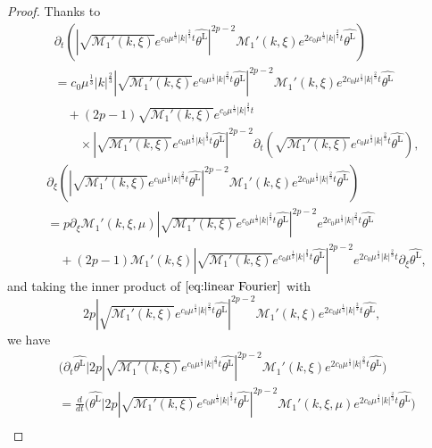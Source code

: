 \documentclass[reqno, 12pt]{amsart} %
\theoremstyle{plain} %
\theoremstyle{definition}
\theoremstyle{remark}
\numberwithin{equation}{section} %
\newcommand{\lt}{\left}
\newcommand{\rt}{\right}
\newcommand{\pt}{\partial_t}
\begin{document}
\begin{proof}
		Thanks to 
		\begin{align*}
			&\pt\lt( | \sqrt{\mathcal{M}_1'(k, \xi)} e^{c_0 \mu^\frac13 |k|^\frac23 t} \widehat{\theta^{\mathrm{L}} }|^{2p-2} \mathcal{M}_1'(k, \xi) e^{2c_0 \mu^\frac13 |k|^\frac23 t} \widehat{\theta^{\mathrm{L}} } \rt) \\
			&=c_0\mu^\frac13 |k|^\frac23 | \sqrt{\mathcal{M}_1'(k, \xi)} e^{c_0 \mu^\frac13 |k|^\frac23 t} \widehat{\theta^{\mathrm{L}} }|^{2p-2}  \mathcal{M}_1'(k, \xi) e^{2c_0 \mu^\frac13 |k|^\frac23 t} \widehat{\theta^{\mathrm{L}} }\\
			& \quad + (2p-1) \sqrt{\mathcal{M}_1'(k, \xi)} e^{c_0 \mu^\frac13 |k|^\frac23 t} \\
			&\qquad \times | \sqrt{\mathcal{M}_1'(k, \xi)} e^{c_0 \mu^\frac13 |k|^\frac23 t} \widehat{\theta^{\mathrm{L}} }|^{2p-2} \pt( \sqrt{\mathcal{M}_1'(k, \xi)} e^{c_0 \mu^\frac13 |k|^\frac23 t} \widehat{\theta^{\mathrm{L}} }),
		\end{align*}
		\begin{align*}
			&\partial_\xi \lt( | \sqrt{\mathcal{M}_1'(k, \xi)} e^{c_0 \mu^\frac13 |k|^\frac23 t} \widehat{\theta^{\mathrm{L}} }|^{2p-2} \mathcal{M}_1'(k, \xi) e^{2c_0 \mu^\frac13 |k|^\frac23 t} \widehat{\theta^{\mathrm{L}} } \rt) \\
			&=  p \partial_\xi  \mathcal{M}_1'(k, \xi, \mu)  | \sqrt{\mathcal{M}_1'(k, \xi)} e^{c_0 \mu^\frac13 |k|^\frac23 t} \widehat{\theta^{\mathrm{L}} }|^{2p-2}    e^{2c_0 \mu^\frac13 |k|^\frac23 t} \widehat{\theta^{\mathrm{L}} }\\
			& \quad + (2p-1) \mathcal{M}_1'(k, \xi)  | \sqrt{\mathcal{M}_1'(k, \xi)} e^{c_0 \mu^\frac13 |k|^\frac23 t} \widehat{\theta^{\mathrm{L}} }|^{2p-2}   e^{2c_0 \mu^\frac13 |k|^\frac23 t}    \partial_\xi\widehat{\theta^{\mathrm{L}} },
		\end{align*}
		and taking the inner product of $\eqref{eq:linear Fourier}$ with $$2p | \sqrt{\mathcal{M}_1'(k, \xi)} e^{c_0 \mu^\frac13 |k|^\frac23 t} \widehat{\theta^{\mathrm{L}} }|^{2p-2} \mathcal{M}_1'(k, \xi) e^{2c_0 \mu^\frac13 |k|^\frac23 t} \widehat{\theta^{\mathrm{L}} },$$ we have
		\begin{align*}
			&\big( \pt \widehat{\theta^{\mathrm{L}}} \big| 2p | \sqrt{\mathcal{M}_1'(k, \xi)} e^{c_0 \mu^\frac13 |k|^\frac23 t} \widehat{\theta^{\mathrm{L}} }|^{2p-2} \mathcal{M}_1'(k, \xi) e^{2c_0 \mu^\frac13 |k|^\frac23 t} \widehat{\theta^{\mathrm{L}} } \big) \\
			&= \frac{d}{dt} \big(  \widehat{\theta^{\mathrm{L}}} \big| 2p | \sqrt{\mathcal{M}_1'(k, \xi)} e^{c_0 \mu^\frac13 |k|^\frac23 t} \widehat{\theta^{\mathrm{L}} }|^{2p-2} \mathcal{M}_1'(k, \xi, \mu) e^{2c_0 \mu^\frac13 |k|^\frac23 t} \widehat{\theta^{\mathrm{L}} } \big) \\

\end{align*}
\end{proof}
\end{document}
